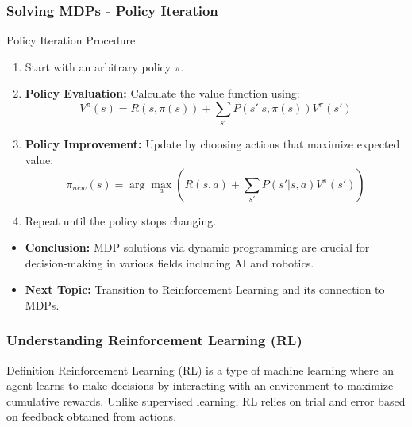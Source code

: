 \documentclass[aspectratio=169]{beamer}
\begin{document}
\begin{frame}[fragile]
    \frametitle{Solving MDPs - Policy Iteration}
    \begin{block}{Policy Iteration Procedure}
        \begin{enumerate}
            \item Start with an arbitrary policy \( \pi \).
            \item \textbf{Policy Evaluation:} Calculate the value function using:
            \begin{equation}
            V^\pi(s) = R(s, \pi(s)) + \sum_{s'} P(s'|s, \pi(s)) V^\pi(s')
            \end{equation}
            \item \textbf{Policy Improvement:} Update by choosing actions that maximize expected value:
            \begin{equation}
            \pi_{new}(s) = \arg\max_{a} \left( R(s, a) + \sum_{s'} P(s'|s, a) V^\pi(s') \right)
            \end{equation}
            \item Repeat until the policy stops changing.
        \end{enumerate}
    \end{block}
    
    \begin{itemize}
        \item \textbf{Conclusion:} MDP solutions via dynamic programming are crucial for decision-making in various fields including AI and robotics.
        \item \textbf{Next Topic:} Transition to Reinforcement Learning and its connection to MDPs.
    \end{itemize}
\end{frame}

\begin{frame}[fragile]
    \frametitle{Understanding Reinforcement Learning (RL)}
    \begin{block}{Definition}
        Reinforcement Learning (RL) is a type of machine learning where an agent learns to make decisions by interacting with an environment to maximize cumulative rewards. Unlike supervised learning, RL relies on trial and error based on feedback obtained from actions.
    \end{block}
\end{frame}
\end{document}
